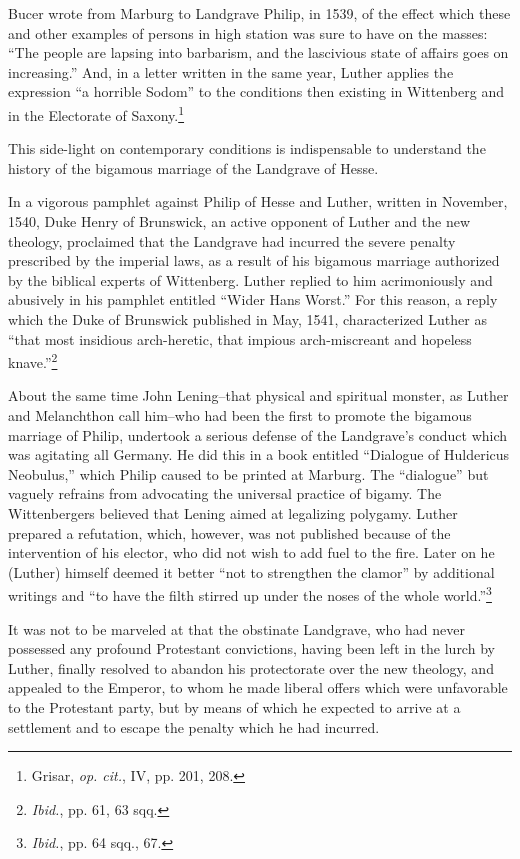 Bucer wrote from Marburg to Landgrave Philip, in 1539, of the
effect which these and other examples of persons in high station was
sure to have on the masses: “The people are lapsing into barbarism,
and the lascivious state of affairs goes on increasing.” And, in a letter
written in the same year, Luther applies the expression “a horrible
Sodom” to the conditions then existing in Wittenberg and in the Electorate
of Saxony.\footnote{Grisar, \textit{op. cit.}, IV, pp. 201, 208.}

This side-light on contemporary conditions is indispensable to
understand the history of the bigamous marriage of the Landgrave of
Hesse.

In a vigorous pamphlet against Philip of Hesse and Luther, written
in November, 1540, Duke Henry of Brunswick, an active opponent of
Luther and the new theology, proclaimed that the Landgrave had incurred
the severe penalty prescribed by the imperial laws, as a result of his bigamous
marriage authorized by the biblical experts of Wittenberg. Luther replied to
him acrimoniously and abusively in his pamphlet entitled “Wider Hans
Worst.” For this reason, a reply which the Duke of Brunswick published
in May, 1541, characterized Luther as “that most insidious arch-heretic,
that impious arch-miscreant and hopeless knave.”\footnote{\textit{Ibid.}, pp. 61, 63 sqq.}

About the same time John Lening--that physical and spiritual monster,
as Luther and Melanchthon call him--who had been the first to promote the
bigamous marriage of Philip, undertook a serious defense of the Landgrave’s
conduct which was agitating all Germany. He did this in a book entitled
“Dialogue of Huldericus Neobulus,” which Philip caused to be printed at
Marburg. The “dialogue” but vaguely refrains from advocating the universal
practice of bigamy. The Wittenbergers believed that Lening aimed
at legalizing polygamy. Luther prepared a refutation, which, however, was
not published because of the intervention of his elector, who did not wish
to add fuel to the fire. Later on he (Luther) himself deemed it better “not
to strengthen the clamor” by additional writings and “to have the filth
stirred up under the noses of the whole world.”\footnote{\textit{Ibid.}, pp. 64 sqq., 67.}

It was not to be marveled at that the obstinate Landgrave, who had
never possessed any profound Protestant convictions, having been
left in the lurch by Luther, finally resolved to abandon his protectorate
over the new theology, and appealed to the Emperor, to whom he
made liberal offers which were unfavorable to the Protestant party,
but by means of which he expected to arrive at a settlement and to
escape the penalty which he had incurred.

